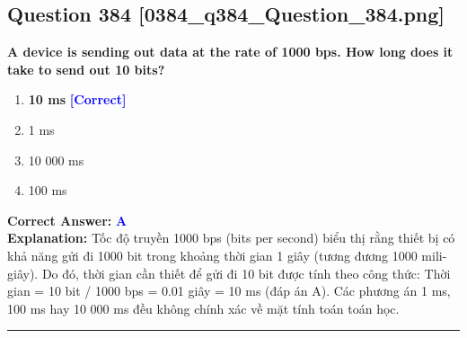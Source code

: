 \documentclass[11pt,a4paper]{article}
\begin{document}
\begin{minipage}{\textwidth}
\subsection*{Question 384 \quad \footnotesize{[0384\_q384\_Question\_384.png]}}
\noindent \textbf{A device is sending out data at the rate of 1000 bps. How long does it take to send out 10 bits?}

\begin{enumerate}[label=\Alph*.]
    \item \textbf{10 ms} \hfill \textcolor{blue}{\textbf{[Correct]}}
    \item 1 ms
    \item 10 000 ms
    \item 100 ms
\end{enumerate}

\noindent \textbf{Correct Answer:} \textcolor{blue}{\textbf{A}} \\[2pt]
\noindent \textbf{Explanation:} Tốc độ truyền 1000 bps (bits per second) biểu thị rằng thiết bị có khả năng gửi đi 1000 bit trong khoảng thời gian 1 giây (tương đương 1000 mili-giây). Do đó, thời gian cần thiết để gửi đi 10 bit được tính theo công thức: Thời gian = 10 bit / 1000 bps = 0.01 giây = 10 ms (đáp án A). Các phương án 1 ms, 100 ms hay 10 000 ms đều không chính xác về mặt tính toán toán học.

\par\vspace{0.3cm}
\hrule
\vspace{0.3cm}
\end{minipage}
\end{document}

